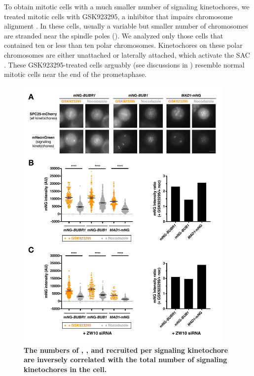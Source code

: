 To obtain mitotic cells with a much smaller number of signaling kinetochores, we treated mitotic cells with GSK923295, a  inhibitor that impairs chromosome alignment \cite{GSK923295}. In these cells, usually a variable but smaller number of chromosomes are stranded near the spindle poles (). We analyzed only those cells that contained ten or less than ten polar chromosomes. Kinetochores on these polar chromosomes are either unattached or laterally attached, which activate the SAC \cite{GSK923295LateralAttachmentEM, GSK923295MonastrolCotreatment}. These GSK923295-treated cells arguably (see discussions in ) resemble normal mitotic cells near the end of the prometaphase.

\begin{figure} [b!]
    \centering
    \includegraphics[width=0.95\textwidth]{chapters/figures/SACProteinKinetochoreRecruitment.pdf}
    \caption{\textbf{The numbers of , , and  recruited per signaling kinetochore are inversely correlated with the total number of signaling kinetochores in the cell.}}
    \label{SACProteinKinetochoreRecruitment}
\end{figure}
